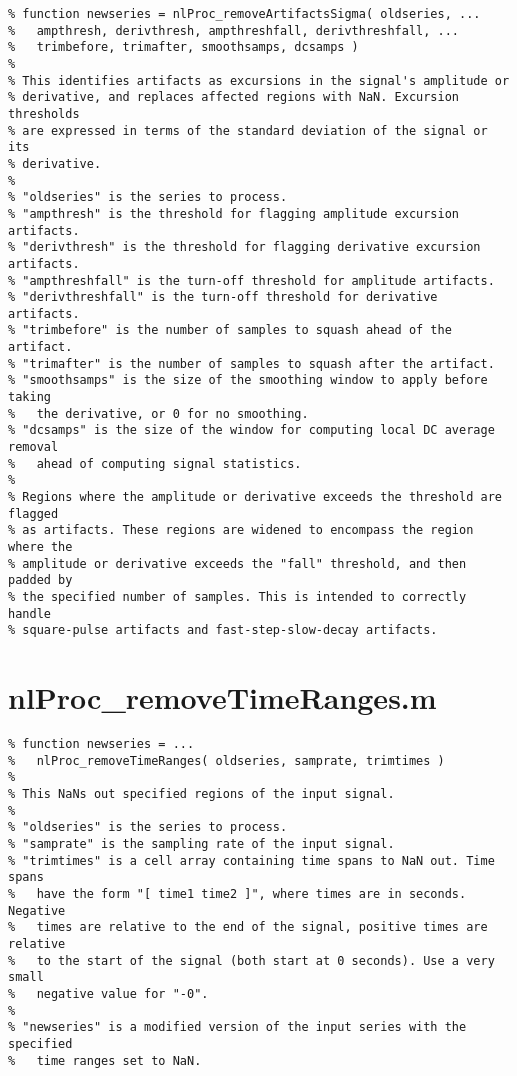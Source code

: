 \begin{verbatim}
% function newseries = nlProc_removeArtifactsSigma( oldseries, ...
%   ampthresh, derivthresh, ampthreshfall, derivthreshfall, ...
%   trimbefore, trimafter, smoothsamps, dcsamps )
%
% This identifies artifacts as excursions in the signal's amplitude or
% derivative, and replaces affected regions with NaN. Excursion thresholds
% are expressed in terms of the standard deviation of the signal or its
% derivative.
%
% "oldseries" is the series to process.
% "ampthresh" is the threshold for flagging amplitude excursion artifacts.
% "derivthresh" is the threshold for flagging derivative excursion artifacts.
% "ampthreshfall" is the turn-off threshold for amplitude artifacts.
% "derivthreshfall" is the turn-off threshold for derivative artifacts.
% "trimbefore" is the number of samples to squash ahead of the artifact.
% "trimafter" is the number of samples to squash after the artifact.
% "smoothsamps" is the size of the smoothing window to apply before taking
%   the derivative, or 0 for no smoothing.
% "dcsamps" is the size of the window for computing local DC average removal
%   ahead of computing signal statistics.
%
% Regions where the amplitude or derivative exceeds the threshold are flagged
% as artifacts. These regions are widened to encompass the region where the
% amplitude or derivative exceeds the "fall" threshold, and then padded by
% the specified number of samples. This is intended to correctly handle
% square-pulse artifacts and fast-step-slow-decay artifacts.
\end{verbatim}

\section{nlProc\_removeTimeRanges.m}

\begin{verbatim}
% function newseries = ...
%   nlProc_removeTimeRanges( oldseries, samprate, trimtimes )
%
% This NaNs out specified regions of the input signal.
%
% "oldseries" is the series to process.
% "samprate" is the sampling rate of the input signal.
% "trimtimes" is a cell array containing time spans to NaN out. Time spans
%   have the form "[ time1 time2 ]", where times are in seconds. Negative
%   times are relative to the end of the signal, positive times are relative
%   to the start of the signal (both start at 0 seconds). Use a very small
%   negative value for "-0".
%
% "newseries" is a modified version of the input series with the specified
%   time ranges set to NaN.
\end{verbatim}

